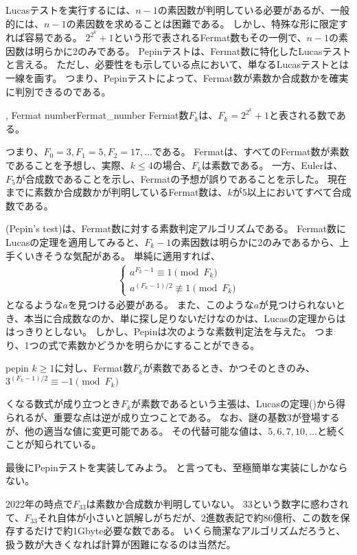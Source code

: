 Lucasテストを実行するには、$n-1$の素因数が判明している必要があるが、一般的には、$n-1$の素因数を求めることは困難である。
しかし、特殊な形に限定すれば容易である。
$2^{2^k} + 1$という形で表されるFermat数もその一例で、$n-1$の素因数は明らかに2のみである。
Pepinテストは、Fermat数に特化したLucasテストと言える。
ただし、必要性をも示している点において、単なるLucasテストとは一線を画す。
つまり、Pepinテストによって、Fermat数が素数か合成数かを確実に判別できるのである。

\begin{Defi}{, Fermat number}{Fermat_number}
Fermat数$F_k$は、$F_k=2^{2^k} + 1$と表される数である。
\end{Defi}

つまり、$F_0=3, F_1 = 5, F_2 = 17,\ldots$である。
Fermatは、すべてのFermat数が素数であることを予想し、実際、$k \le 4$の場合、$F_k$は素数である。
一方、Eulerは、$F_5$が合成数であることを示し、Fermatの予想が誤りであることを示した。
現在までに素数か合成数かが判明しているFermat数は、$k$が$5$以上においてすべて合成数である。

(Pepin's test)は、Fermat数に対する素数判定アルゴリズムである。
Fermat数にLucasの定理を適用してみると、$F_k - 1$の素因数は明らかに2のみであるから、上手くいきそうな気配がある。
単純に適用すれば、
\begin{align*}
\begin{cases}
a^{F_k-1} \equiv 1 \pmod{F_k}\\
a^{(F_k-1)/2} \not\equiv 1 \pmod{F_k}
\end{cases}
\end{align*}
となるような$a$を見つける必要がある。
また、このような$a$が見つけられないとき、本当に合成数なのか、単に探し足りないだけなのかは、Lucasの定理からははっきりとしない。
しかし、Pepinは次のような素数判定法を与えた。
つまり、1つの式で素数かどうかを明らかにすることができる。

\begin{Theo}{}{pepin}
$k\ge1$に対し、Fermat数$F_k$が素数であるとき、かつそのときのみ、$3^{(F_k - 1)/2}\equiv-1\pmod{F_k}$
\end{Theo}

くなる数式が成り立つとき$F_k$が素数であるという主張は、Lucasの定理()から得られるが、重要な点は逆が成り立つことである。
なお、謎の基数3が登場するが、他の適当な値に変更可能である。
その代替可能な値は、$5,6,7,10,\ldots$と続くことが知られている。

最後にPepinテストを実装してみよう。
と言っても、至極簡単な実装にしかならない。


2022年の時点で$F_{33}$は素数か合成数か判明していない。
33という数字に惑わされて、$F_{33}$それ自体が小さいと誤解しがちだが、2進数表記で約86億桁、この数を保存するだけで約1Gbyte必要な数である。
いくら簡潔なアルゴリズムだろうと、扱う数が大きくなれば計算が困難になるのは当然だ。
